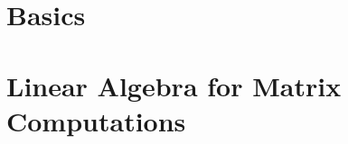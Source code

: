 \documentclass{SIAMGHbook2016}
\begin{document}
\chapter[Basics]{Basics}









\chapter[Linear Algebra for Matrix Computations]{Linear Algebra for Matrix Computations}





\backmatter




\cleardoublepage

\printindex
\end{document}
